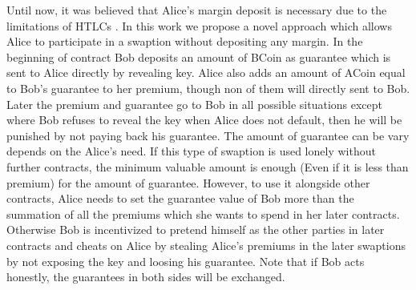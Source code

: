 \label{app:margin-free-swaption}
Until now, it was believed that Alice's margin deposit is necessary due to the limitations of HTLCs \cite{liu2018atomic}. In this work we propose a novel approach which allows Alice to participate in a swaption without depositing any margin.
In the beginning of contract Bob deposits an amount of BCoin as guarantee which is sent to Alice directly by revealing \Aone key. Alice also adds an amount of ACoin equal to Bob's guarantee to her premium, though non of them will directly sent to Bob. Later the premium and guarantee go to Bob in all possible situations except where Bob refuses to reveal the \keyone key when Alice does not default, then he will be punished by not paying back his guarantee.
The amount of guarantee can be vary depends on the Alice's need.
If this type of swaption is used lonely without further contracts, the minimum valuable amount is enough (Even if it is less than premium) for the amount of guarantee. However, to use it alongside other contracts, Alice needs to set the guarantee value of Bob more than the summation of all the premiums which she wants to spend in her later contracts. Otherwise Bob is incentivized to pretend himself as the other parties in later contracts and cheats on Alice by stealing Alice's premiums in the later swaptions by not exposing the \keyone key and loosing his guarantee. Note that if Bob acts honestly, the guarantees in both sides will be exchanged.

